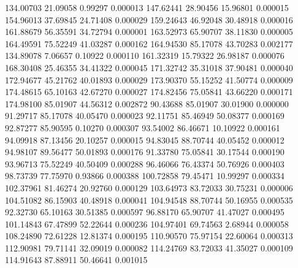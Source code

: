      134.00703       21.09058        0.99297       0.000013
      147.62441       28.90456       15.96801       0.000015
      154.96013       37.69845       24.71408       0.000029
      159.24643       46.92048       30.48918       0.000016
      161.88679       56.35591       34.72794       0.000001
      163.52973       65.90707       38.11830       0.000005
      164.49591       75.52249       41.03287       0.000162
      164.94530       85.17078       43.70283       0.002177
      134.89078        7.06657        0.10922       0.000110
      161.32319       15.79322       26.98187       0.000076
      168.30408       25.46355       34.41322       0.000045
      171.32742       35.31018       37.90481       0.000040
      172.94677       45.21762       40.01893       0.000029
      173.90370       55.15252       41.50774       0.000009
      174.48615       65.10163       42.67270       0.000027
      174.82456       75.05841       43.66220       0.000171
      174.98100       85.01907       44.56312       0.002872
       90.43688       85.01907       30.01900       0.000000
       91.29717       85.17078       40.05470       0.000023
       92.11751       85.46949       50.08377       0.000169
       92.87277       85.90595        0.10270       0.000307
       93.54002       86.46671       10.10922       0.000161
       94.09918       87.13456       20.10257       0.000015
       94.83045       88.70744       40.05452       0.000012
       94.98107       89.56477       50.01893       0.000176
       91.33780       75.05841       30.17544       0.000190
       93.96713       75.52249       40.50409       0.000288
       96.46066       76.43374       50.76926       0.000403
       98.73739       77.75970        0.93866       0.000388
      100.72858       79.45471       10.99297       0.000334
      102.37961       81.46274       20.92760       0.000129
      103.64973       83.72033       30.75231       0.000006
      104.51082       86.15903       40.48918       0.000041
      104.94548       88.70744       50.16955       0.000535
       92.32730       65.10163       30.51385       0.000597
       96.88170       65.90707       41.47027       0.000495
      101.14843       67.47899       52.22644       0.000236
      104.97401       69.74563        2.68944       0.000058
      108.24890       72.61228       12.81374       0.000195
      110.90570       75.97154       22.60064       0.000313
      112.90981       79.71141       32.09019       0.000082
      114.24769       83.72033       41.35027       0.000109
      114.91643       87.88911       50.46641       0.001015
